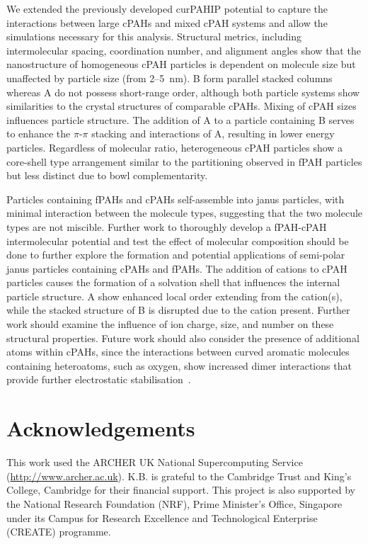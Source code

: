 We extended the previously developed curPAHIP potential to capture the interactions between large cPAHs and mixed cPAH systems and allow the simulations necessary for this analysis. Structural metrics, including intermolecular spacing, coordination number, and alignment angles show that the nanostructure of homogeneous cPAH particles is dependent on molecule size but unaffected by particle size (from 2--5~nm). B form parallel stacked columns whereas A do not possess short-range order, although both particle systems show similarities to the crystal structures of comparable cPAHs. Mixing of cPAH sizes influences particle structure. The addition of A to a particle containing B serves to enhance the $\pi$-$\pi$ stacking and interactions of A, resulting in lower energy particles. %
Regardless of molecular ratio, heterogeneous cPAH particles show a core-shell type arrangement similar to the partitioning observed in fPAH particles but less distinct due to bowl complementarity. 

Particles containing fPAHs and cPAHs self-assemble into janus particles, with minimal interaction between the molecule types, suggesting that the two molecule types are not miscible. Further work to thoroughly develop a fPAH-cPAH intermolecular potential and test the effect of molecular composition should be done to further explore the formation and potential applications of semi-polar janus particles containing cPAHs and fPAHs. The addition of cations to cPAH particles causes the formation of a solvation shell that influences the internal particle structure. A show enhanced local order extending from the cation(s), while the stacked structure of B is disrupted due to the cation present. Further work should examine the influence of ion charge, size, and number on these structural properties. Future work should also consider the presence of additional atoms within cPAHs, since the interactions between curved aromatic molecules containing heteroatoms, such as oxygen, show increased dimer interactions that provide further electrostatic stabilisation~\cite{Cabaleiro-Lago2018}.  

\section*{Acknowledgements}
This work used the ARCHER UK National Supercomputing Service (\url{http://www.archer.ac.uk}).
K.B. is grateful to the Cambridge Trust and King's College, Cambridge for their financial support.
This project is also supported by the National Research Foundation (NRF), Prime Minister's Office, Singapore under its Campus for Research Excellence and Technological Enterprise (CREATE) programme.
